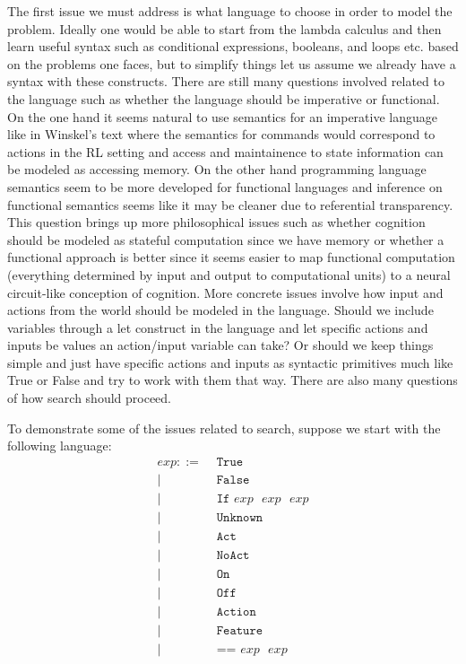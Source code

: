 \documentclass[a4paper,12pt]{article}
\begin{document}
The first issue we must address is what language to choose in order to model the problem.  Ideally one would be able to start from the lambda calculus and then learn useful syntax such as conditional expressions, booleans, and loops etc. based on the problems one faces, but to simplify things let us assume we already have a syntax with these constructs.  There are still many questions involved related to the language such as whether the language should be imperative or functional.  On the one hand it seems natural to use semantics for an imperative language like in Winskel's text \cite{Winskel1993Formal} where the semantics for commands would correspond to actions in the RL setting and access and maintainence to state information can be modeled as accessing memory.  On the other hand programming language semantics seem to be more developed for functional languages \cite{Pierce2002Types} and inference on functional semantics seems like it may be cleaner due to referential transparency.  This question brings up more philosophical issues such as whether cognition should be modeled as stateful computation since we have memory or whether a functional approach is better since it seems easier to map functional computation (everything determined by input and output to computational units) to a neural circuit-like conception of cognition.  More concrete issues involve how input and actions from the world should be modeled in the language.  Should we include variables through a let construct in the language and let specific actions and inputs be values an action/input variable can take?  Or should we keep things simple and just have specific actions and inputs as syntactic primitives much like True or False and try to work with them that way.  There are also many questions of how search should proceed. 

To demonstrate some of the issues related to search, suppose we start with the following language:
\begin{align*}
exp ::= &\texttt{ True} \\
    |& \texttt{ False} \\
    |& \texttt{ If } exp \texttt{ }exp \texttt{ } exp \\
    |& \texttt{ Unknown }\\
    |& \texttt{ Act }\\
    |& \texttt{ NoAct }\\
    |& \texttt{ On }\\
    |& \texttt{ Off }\\
    |& \texttt{ Action }\\
    |& \texttt{ Feature }\\
    |& \texttt{ == }exp \texttt{ }exp
\end{align*}
\end{document}
